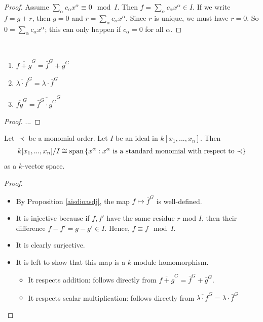 \documentclass[a4paper, 11pt]{article}
\begin{document}
\begin{proof}
  Assume \( \sum_\alpha c_\alpha x^\alpha \equiv 0 \mod I \). Then \( f = \sum_\alpha c_\alpha x^\alpha \in I \). If we write \( f = g + r \), then \(  g = 0 \) and \( r = \sum_\alpha c_\alpha x^\alpha \). Since \( r \) is unique, we must have \( r = 0 \). So \( 0 = \sum_\alpha c_\alpha x^\alpha \); this can only happen if \( c_\alpha = 0 \) for all \( \alpha \).
\end{proof}

\begin{prop}\(  \)
  \begin{enumerate}
    \item \( \overline{f + g}^G = \bar f^G + \bar g^G \)
    \item \( \overline{\lambda \cdot f}^G = \lambda \cdot \bar f^G \) 
    \item \( \overline{fg}^G = \overline{\bar f^G \cdot \bar g^G}^G \)
  \end{enumerate}
\end{prop}

\begin{proof}
  ...
\end{proof}





\begin{mdframed}
\begin{thm}
  Let \( \prec \) be a monomial order. Let \( I \) be an ideal in \( k[x_1,...,x_n] \). Then 
  \begin{align*}
    k[x_1,...,x_n] / I \cong \mathrm{span}\left\{ x^\alpha : \text{\( x^\alpha \) is a standard monomial with respect to \( \prec \)} \right\}
  \end{align*}
  as a \( k \)-vector space.
\end{thm}
\end{mdframed}

\begin{proof}\(  \)
  \begin{itemize}
    \item   By Proposition \ref{aisdioasdj}, the map \( f \mapsto \overline{f}^G \) is well-defined. 
    \item   It is injective because if \( f,f' \) have the same residue \( r \) mod \( I \), then their difference \( f -f' = g - g' \in I  \). Hence, \( f \equiv f \mod I \).
    \item   It is clearly surjective.
    \item   It is left to show that this map is a \( k \)-module homomorphism.
    \begin{itemize}
      \item It respects addition: follows directly from \( \overline{f + g}^G = \bar f^G + \bar g^G  \).
      \item It respects scalar multiplication: follows directly from  \( \overline{\lambda \cdot f}^G = \lambda \cdot \bar f^G  \)
    \end{itemize}
  \end{itemize}
\end{proof}
\end{document}
